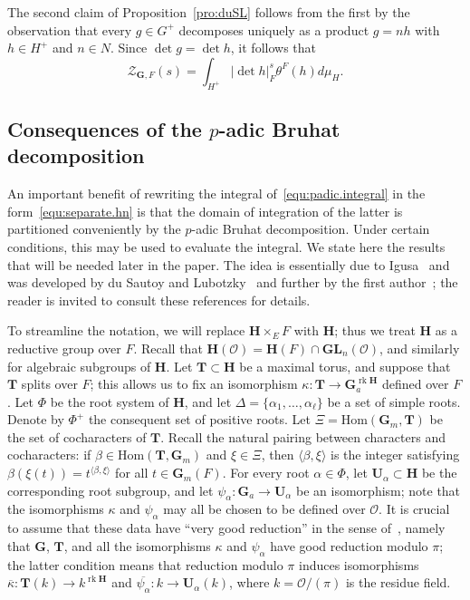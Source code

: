 \documentclass[11pt,a4paper]{amsart}
\theoremstyle{plain}
\theoremstyle{remark}
\newcommand{\dimL}{n}
\DeclareMathOperator{\rk}{rk}
\begin{document}
The second claim of Proposition~\ref{pro:duSL} follows from the first by the observation that every $g \in G^+$ decomposes uniquely as a product $g = nh$ with $h \in H^+$ and $n \in N$.  Since $\det g = \det h$, it follows that 
\begin{equation} \label{equ:separate.hn}
 \mathcal{Z}_{\mathbf{G}, F}(s) = \int_{H^+} | \det h |_{F}^s \theta^F(h)  d \mu_H.
 \end{equation}

\subsection{Consequences of the $p$-adic Bruhat decomposition}
An important benefit of rewriting the integral of~\eqref{equ:padic.integral} in the form~\eqref{equ:separate.hn} is that the domain of integration of the latter is partitioned conveniently by the $p$-adic Bruhat decomposition.  Under certain conditions, this may be used to evaluate the integral.  We state here the results that will be needed later in the paper.  The idea is essentially due to Igusa~\cite{Igusa/89} and was developed by du Sautoy and Lubotzky~\cite[\S5]{duSLubotzky/96} and further by the first author~\cite[\S4]{Berman/11}; the reader is invited to consult these references for details.

To streamline the notation, we will replace $\mathbf{H} \times_E F$ with $\mathbf{H}$; thus we treat $\mathbf{H}$ as a reductive group over $F$.  Recall that $\mathbf{H}(\mathcal{O}) = \mathbf{H}(F) \cap \mathbf{GL}_\dimL(\mathcal{O})$, and similarly for algebraic subgroups of $\mathbf{H}$.  Let $\mathbf{T} \subset \mathbf{H}$ be a maximal torus, and suppose that $\mathbf{T}$ splits over $F$; this allows us to fix an isomorphism $\kappa: \mathbf{T} \to \mathbf{G}_a^{\rk \mathbf{H}}$ defined over $F$.  Let $\Phi$ be the root system of $\mathbf{H}$, and let $\Delta = \{ \alpha_1, \dots, \alpha_\ell \}$ be a set of simple roots.  Denote by $\Phi^+$ the consequent set of positive roots.  Let $\Xi = \mathrm{Hom}(\mathbf{G}_m, \mathbf{T})$ be the set of cocharacters of $\mathbf{T}$.  Recall the natural pairing between characters and cocharacters: if $\beta \in \mathrm{Hom}(\mathbf{T}, \mathbf{G}_m)$ and $\xi \in \Xi$, then $\langle \beta, \xi \rangle$ is the integer satisfying $\beta(\xi(t)) = t^{\langle \beta, \xi \rangle}$ for all $t \in \mathbf{G}_m(F)$.  For every root $\alpha \in \Phi$, let $\mathbf{U}_\alpha \subset \mathbf{H}$ be the corresponding root subgroup, and let $\psi_\alpha : \mathbf{G}_a \to \mathbf{U}_\alpha$ be an isomorphism; note that the isomorphisms $\kappa$ and $\psi_\alpha$ may all be chosen to be defined over $\mathcal{O}$.  It is crucial to assume that these data have ``very good reduction'' in the sense of~\cite[II.2]{Igusa/89}, namely that $\mathbf{G}$, $\mathbf{T}$, and all the isomorphisms $\kappa$ and $\psi_\alpha$ have good reduction modulo $\pi$; the latter condition means that reduction modulo $\pi$ induces isomorphisms $\overline{\kappa} : \mathbf{T}(k) \to k^{\rk \mathbf{H}}$ and $\overline{\psi_\alpha} : k \to \mathbf{U}_\alpha(k)$, where $k = \mathcal{O} / (\pi)$ is the residue field.  
\end{document}
